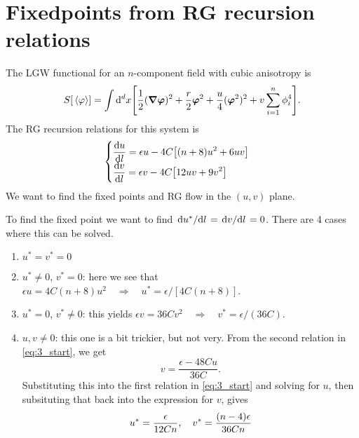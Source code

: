 \documentclass[11pt,letter, swedish, english
]{article}
\renewcommand{\thesubsection}{\arabic{section} (\alph{subsection})}
\begin{document}
\section{Fixedpoints from RG recursion relations}
\renewcommand{\thesubsection}{\arabic{section} (\roman{subsection})}
The LGW functional for an $n$-component field with cubic anisotropy is
\begin{equation}
S[\ev*\varphi] = \int\rd^dx \qty[
\frac{1}{2}(\grad\vb*\varphi)^2
+\frac{r}{2}\vb*\varphi^2 +\frac{u}{4}(\vb*\varphi^2)^2
+v\sum_{i=1}^n\phi_i^4 ].
\end{equation}
The RG recursion relations for this system is
\begin{equation}\label{eq:3_start}
\begin{cases}\displaystyle
\dv{u}{l} = \epsilon u - 4C\qty[(n+8)u^2 + 6uv] 
\\ \displaystyle
\dv{v}{l} = \epsilon v - 4C\qty[12uv + 9v^2]
\end{cases}
\end{equation}
We want to find the fixed points and RG flow in the $(u, v)$ plane. 

To find the fixed point we want to find
$\dv*{u^*}{l}=\dv*{v}{l}=0$. There are 4 cases where this can be solved.
\begin{enumerate}[label=(\roman*)]
\item $u^*=v^*=0$
\item $u^*\neq0$, $v^*=0$: here we see that 
$\epsilon u = 4C(n+8)u^2 \quad\Longrightarrow\quad u^* = \epsilon/[4C(n+8)]$.
\item $u^*=0$, $v^*\neq0$: this yields 
$\epsilon v = 36Cv^2 \quad\Longrightarrow\quad v^* = \epsilon/(36C)$.
\item $u, v\neq0$: this one is a bit trickier, but not very. From the
second relation in \eqref{eq:3_start}, we get 
\[ v = \frac{\epsilon-48Cu}{36C}. \]
Substituting this into the first relation in \eqref{eq:3_start} and
solving\footnotemark{} for $u$, then subsituting that back into the
expression for $v$, gives
\[ u^* = \frac{\epsilon}{12Cn}\qcomma v^* = \frac{(n-4)\epsilon}{36Cn} \]
\end{enumerate}

\end{document}
